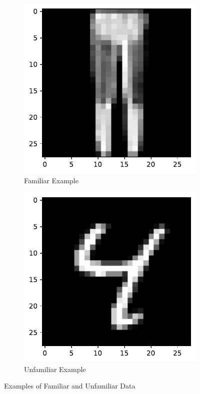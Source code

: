 \begin{figure}[!htb]
\centering
\begin{subfigure}{.5\textwidth}
  \centering
  \includegraphics[scale=0.5]{Figures/familiar_example.pdf}
  \caption{Familiar Example}
  \label{fig:familiar_example}
\end{subfigure}%
\begin{subfigure}{.5\textwidth}
    \centering
    \includegraphics[scale=0.5]{Figures/MNIST_digit.pdf}
    \caption{Unfamiliar Example}
    \label{fig:unfamiliar_example}
\end{subfigure}
\caption{Examples of Familiar and Unfamiliar Data}
\label{fig:examples}
\end{figure}

